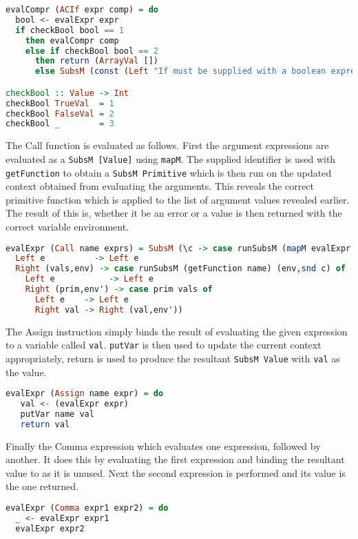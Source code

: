 \documentclass{article}
\begin{document}
\begin{lstlisting}[language=Haskell]
evalCompr (ACIf expr comp) = do
  bool <- evalExpr expr
  if checkBool bool == 1
    then evalCompr comp
    else if checkBool bool == 2
      then return (ArrayVal [])
      else SubsM (const (Left "If must be supplied with a boolean expression"))

checkBool :: Value -> Int        
checkBool TrueVal  = 1
checkBool FalseVal = 2
checkBool _        = 3
\end{lstlisting}
The Call function is evaluated as follows. First the argument expressions are evaluated as a \texttt{SubsM [Value]} using \texttt{mapM}. The supplied identifier is used with \texttt{getFunction} to obtain a \texttt{SubsM Primitive} which is then run on the updated context obtained from evaluating the arguments. This reveals the correct primitive function which is applied to the list of argument values revealed earlier. The result of this is, whether it be an error or a value is then returned with the correct variable environment.    

\begin{lstlisting}[language=Haskell]
evalExpr (Call name exprs) = SubsM (\c -> case runSubsM (mapM evalExpr exprs) c of
  Left e          -> Left e
  Right (vals,env) -> case runSubsM (getFunction name) (env,snd c) of
    Left e           -> Left e
    Right (prim,env') -> case prim vals of
      Left e    -> Left e
      Right val -> Right (val,env'))
\end{lstlisting}

The Assign instruction simply binds the result of evaluating the given expression to a variable called \texttt{val}. \texttt{putVar} is then used to update the current context appropriately, return is used to produce the resultant \texttt{SubsM Value} with \texttt{val} as the value.

\begin{lstlisting}[language=Haskell]
evalExpr (Assign name expr) = do
   val <- (evalExpr expr)
   putVar name val
   return val
\end{lstlisting}

Finally the Comma expression which evaluates one expression, followed by another. It does this by evaluating the first expression and binding the resultant value to \textunderscore as it is unused. Next the second expression is performed and its value is the one returned.

\begin{lstlisting}[language=Haskell]
evalExpr (Comma expr1 expr2) = do
  _ <- evalExpr expr1
  evalExpr expr2
\end{lstlisting}
\end{document}
